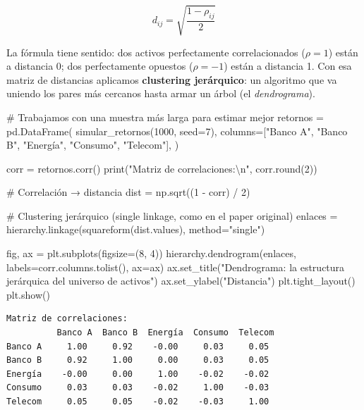 \documentclass[
  spanish,
  letterpaper,
  DIV=11,
  numbers=noendperiod]{scrreprt}
\newenvironment{Shaded}{\begin{snugshade}}{\end{snugshade}}
\newcommand{\BuiltInTok}[1]{\textcolor[rgb]{0.00,0.23,0.31}{#1}}
\newcommand{\CharTok}[1]{\textcolor[rgb]{0.13,0.47,0.30}{#1}}
\newcommand{\CommentTok}[1]{\textcolor[rgb]{0.37,0.37,0.37}{#1}}
\newcommand{\DecValTok}[1]{\textcolor[rgb]{0.68,0.00,0.00}{#1}}
\newcommand{\NormalTok}[1]{\textcolor[rgb]{0.00,0.23,0.31}{#1}}
\newcommand{\OperatorTok}[1]{\textcolor[rgb]{0.37,0.37,0.37}{#1}}
\newcommand{\StringTok}[1]{\textcolor[rgb]{0.13,0.47,0.30}{#1}}
\begin{document}
\[d_{ij} = \sqrt{\frac{1 - \rho_{ij}}{2}}\]

La fórmula tiene sentido: dos activos perfectamente correlacionados
(\(\rho = 1\)) están a distancia 0; dos perfectamente opuestos
(\(\rho = -1\)) están a distancia 1. Con esa matriz de distancias
aplicamos \textbf{clustering jerárquico}: un algoritmo que va uniendo
los pares más cercanos hasta armar un árbol (el \emph{dendrograma}).

\begin{Shaded}
\begin{Highlighting}[]
\CommentTok{\# Trabajamos con una muestra más larga para estimar mejor}
\NormalTok{retornos }\OperatorTok{=}\NormalTok{ pd.DataFrame(}
\NormalTok{    simular\_retornos(}\DecValTok{1000}\NormalTok{, seed}\OperatorTok{=}\DecValTok{7}\NormalTok{),}
\NormalTok{    columns}\OperatorTok{=}\NormalTok{[}\StringTok{"Banco A"}\NormalTok{, }\StringTok{"Banco B"}\NormalTok{, }\StringTok{"Energía"}\NormalTok{, }\StringTok{"Consumo"}\NormalTok{, }\StringTok{"Telecom"}\NormalTok{],}
\NormalTok{)}

\NormalTok{corr }\OperatorTok{=}\NormalTok{ retornos.corr()}
\BuiltInTok{print}\NormalTok{(}\StringTok{"Matriz de correlaciones:}\CharTok{\textbackslash{}n}\StringTok{"}\NormalTok{, corr.}\BuiltInTok{round}\NormalTok{(}\DecValTok{2}\NormalTok{))}

\CommentTok{\# Correlación → distancia}
\NormalTok{dist }\OperatorTok{=}\NormalTok{ np.sqrt((}\DecValTok{1} \OperatorTok{{-}}\NormalTok{ corr) }\OperatorTok{/} \DecValTok{2}\NormalTok{)}

\CommentTok{\# Clustering jerárquico (single linkage, como en el paper original)}
\NormalTok{enlaces }\OperatorTok{=}\NormalTok{ hierarchy.linkage(squareform(dist.values), method}\OperatorTok{=}\StringTok{"single"}\NormalTok{)}

\NormalTok{fig, ax }\OperatorTok{=}\NormalTok{ plt.subplots(figsize}\OperatorTok{=}\NormalTok{(}\DecValTok{8}\NormalTok{, }\DecValTok{4}\NormalTok{))}
\NormalTok{hierarchy.dendrogram(enlaces, labels}\OperatorTok{=}\NormalTok{corr.columns.tolist(), ax}\OperatorTok{=}\NormalTok{ax)}
\NormalTok{ax.set\_title(}\StringTok{"Dendrograma: la estructura jerárquica del universo de activos"}\NormalTok{)}
\NormalTok{ax.set\_ylabel(}\StringTok{"Distancia"}\NormalTok{)}
\NormalTok{plt.tight\_layout()}
\NormalTok{plt.show()}
\end{Highlighting}
\end{Shaded}

\begin{verbatim}
Matriz de correlaciones:
          Banco A  Banco B  Energía  Consumo  Telecom
Banco A     1.00     0.92    -0.00     0.03     0.05
Banco B     0.92     1.00     0.00     0.03     0.05
Energía    -0.00     0.00     1.00    -0.02    -0.02
Consumo     0.03     0.03    -0.02     1.00    -0.03
Telecom     0.05     0.05    -0.02    -0.03     1.00
\end{verbatim}
\end{document}
